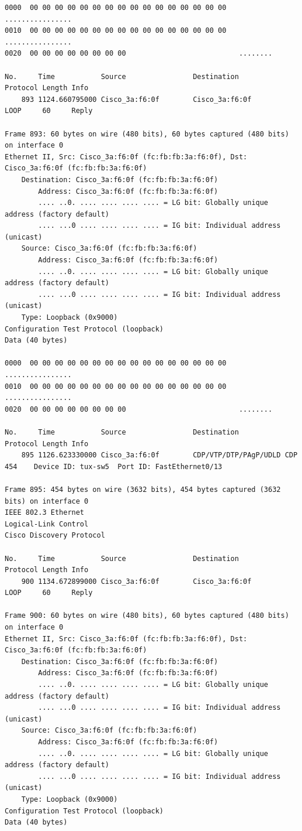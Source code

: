 \documentclass[a4paper,11pt]{article}
\begin{document}
\begin{lstlisting}
0000  00 00 00 00 00 00 00 00 00 00 00 00 00 00 00 00   ................
0010  00 00 00 00 00 00 00 00 00 00 00 00 00 00 00 00   ................
0020  00 00 00 00 00 00 00 00                           ........

No.     Time           Source                Destination           Protocol Length Info
    893 1124.660795000 Cisco_3a:f6:0f        Cisco_3a:f6:0f        LOOP     60     Reply

Frame 893: 60 bytes on wire (480 bits), 60 bytes captured (480 bits) on interface 0
Ethernet II, Src: Cisco_3a:f6:0f (fc:fb:fb:3a:f6:0f), Dst: Cisco_3a:f6:0f (fc:fb:fb:3a:f6:0f)
    Destination: Cisco_3a:f6:0f (fc:fb:fb:3a:f6:0f)
        Address: Cisco_3a:f6:0f (fc:fb:fb:3a:f6:0f)
        .... ..0. .... .... .... .... = LG bit: Globally unique address (factory default)
        .... ...0 .... .... .... .... = IG bit: Individual address (unicast)
    Source: Cisco_3a:f6:0f (fc:fb:fb:3a:f6:0f)
        Address: Cisco_3a:f6:0f (fc:fb:fb:3a:f6:0f)
        .... ..0. .... .... .... .... = LG bit: Globally unique address (factory default)
        .... ...0 .... .... .... .... = IG bit: Individual address (unicast)
    Type: Loopback (0x9000)
Configuration Test Protocol (loopback)
Data (40 bytes)

0000  00 00 00 00 00 00 00 00 00 00 00 00 00 00 00 00   ................
0010  00 00 00 00 00 00 00 00 00 00 00 00 00 00 00 00   ................
0020  00 00 00 00 00 00 00 00                           ........

No.     Time           Source                Destination           Protocol Length Info
    895 1126.623330000 Cisco_3a:f6:0f        CDP/VTP/DTP/PAgP/UDLD CDP      454    Device ID: tux-sw5  Port ID: FastEthernet0/13  

Frame 895: 454 bytes on wire (3632 bits), 454 bytes captured (3632 bits) on interface 0
IEEE 802.3 Ethernet 
Logical-Link Control
Cisco Discovery Protocol

No.     Time           Source                Destination           Protocol Length Info
    900 1134.672899000 Cisco_3a:f6:0f        Cisco_3a:f6:0f        LOOP     60     Reply

Frame 900: 60 bytes on wire (480 bits), 60 bytes captured (480 bits) on interface 0
Ethernet II, Src: Cisco_3a:f6:0f (fc:fb:fb:3a:f6:0f), Dst: Cisco_3a:f6:0f (fc:fb:fb:3a:f6:0f)
    Destination: Cisco_3a:f6:0f (fc:fb:fb:3a:f6:0f)
        Address: Cisco_3a:f6:0f (fc:fb:fb:3a:f6:0f)
        .... ..0. .... .... .... .... = LG bit: Globally unique address (factory default)
        .... ...0 .... .... .... .... = IG bit: Individual address (unicast)
    Source: Cisco_3a:f6:0f (fc:fb:fb:3a:f6:0f)
        Address: Cisco_3a:f6:0f (fc:fb:fb:3a:f6:0f)
        .... ..0. .... .... .... .... = LG bit: Globally unique address (factory default)
        .... ...0 .... .... .... .... = IG bit: Individual address (unicast)
    Type: Loopback (0x9000)
Configuration Test Protocol (loopback)
Data (40 bytes)


\end{lstlisting}
\end{document}

